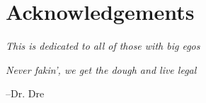 \chapter*{Acknowledgements}

\begin{center}
\textit{This is dedicated to all of those with big egos}

\textit{Never fakin', we get the dough and live legal}
\end{center}
\begin{flushright}
  --Dr. Dre
\end{flushright}